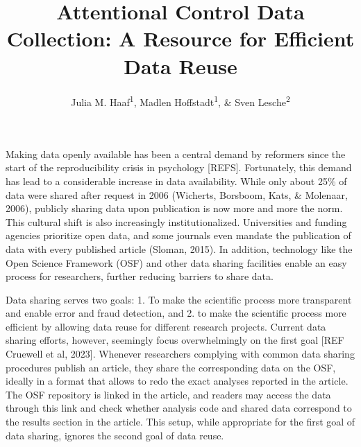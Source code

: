 \documentclass[
  man]{apa6}
\title{Attentional Control Data Collection: A Resource for Efficient Data Reuse}
\author{Julia M. Haaf\textsuperscript{1}, Madlen Hoffstadt\textsuperscript{1}, \& Sven Lesche\textsuperscript{2}}
\date{}
\affiliation{\vspace{0.5cm}\textsuperscript{1} University of Amsterdam\\\textsuperscript{2} University of Heidelberg}
\begin{document}
\maketitle

Making data openly available has been a central demand by reformers since the start of the reproducibility crisis in psychology {[}REFS{]}. Fortunately, this demand has lead to a considerable increase in data availability. While only about 25\% of data were shared after request in 2006 (Wicherts, Borsboom, Kats, \& Molenaar, 2006), publicly sharing data upon publication is now more and more the norm. This cultural shift is also increasingly institutionalized. Universities and funding agencies prioritize open data, and some journals even mandate the publication of data with every published article (Sloman, 2015). In addition, technology like the Open Science Framework (OSF) and other data sharing facilities enable an easy process for researchers, further reducing barriers to share data.

Data sharing serves two goals: 1. To make the scientific process more transparent and enable error and fraud detection, and 2. to make the scientific process more efficient by allowing data reuse for different research projects. Current data sharing efforts, however, seemingly focus overwhelmingly on the first goal {[}REF Cruewell et al, 2023{]}. Whenever researchers complying with common data sharing procedures publish an article, they share the corresponding data on the OSF, ideally in a format that allows to redo the exact analyses reported in the article. The OSF repository is linked in the article, and readers may access the data through this link and check whether analysis code and shared data correspond to the results section in the article. This setup, while appropriate for the first goal of data sharing, ignores the second goal of data reuse.
\end{document}
